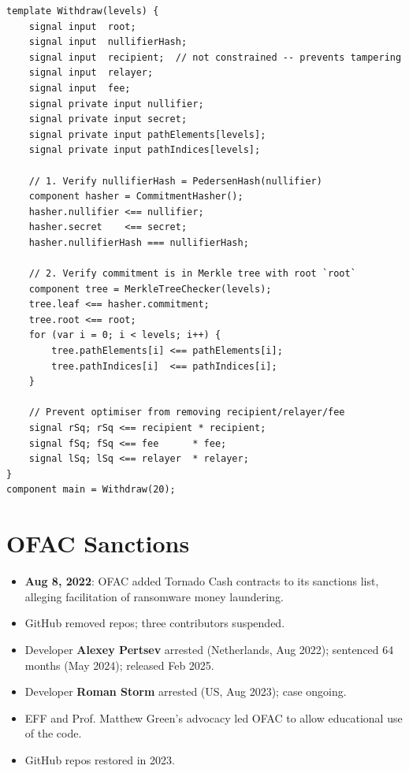 \documentclass[12pt,a4paper,openany]{book}
\theoremstyle{definition}
\theoremstyle{plain}
\theoremstyle{remark}
\begin{document}
\begin{lstlisting}[language={},caption=withdraw.circom (simplified)]
template Withdraw(levels) {
    signal input  root;
    signal input  nullifierHash;
    signal input  recipient;  // not constrained -- prevents tampering
    signal input  relayer;
    signal input  fee;
    signal private input nullifier;
    signal private input secret;
    signal private input pathElements[levels];
    signal private input pathIndices[levels];

    // 1. Verify nullifierHash = PedersenHash(nullifier)
    component hasher = CommitmentHasher();
    hasher.nullifier <== nullifier;
    hasher.secret    <== secret;
    hasher.nullifierHash === nullifierHash;

    // 2. Verify commitment is in Merkle tree with root `root`
    component tree = MerkleTreeChecker(levels);
    tree.leaf <== hasher.commitment;
    tree.root <== root;
    for (var i = 0; i < levels; i++) {
        tree.pathElements[i] <== pathElements[i];
        tree.pathIndices[i]  <== pathIndices[i];
    }

    // Prevent optimiser from removing recipient/relayer/fee
    signal rSq; rSq <== recipient * recipient;
    signal fSq; fSq <== fee      * fee;
    signal lSq; lSq <== relayer  * relayer;
}
component main = Withdraw(20);
\end{lstlisting}

\section{OFAC Sanctions}

\begin{itemize}
  \item \textbf{Aug 8, 2022}: OFAC added Tornado Cash contracts to its
        sanctions list, alleging facilitation of ransomware money
        laundering.
  \item GitHub removed repos; three contributors suspended.
  \item Developer \textbf{Alexey Pertsev} arrested (Netherlands, Aug 2022);
        sentenced 64 months (May 2024); released Feb 2025.
  \item Developer \textbf{Roman Storm} arrested (US, Aug 2023); case ongoing.
  \item EFF and Prof. Matthew Green's advocacy led OFAC to allow
        educational use of the code.
  \item GitHub repos restored in 2023.
\end{itemize}
\end{document}
